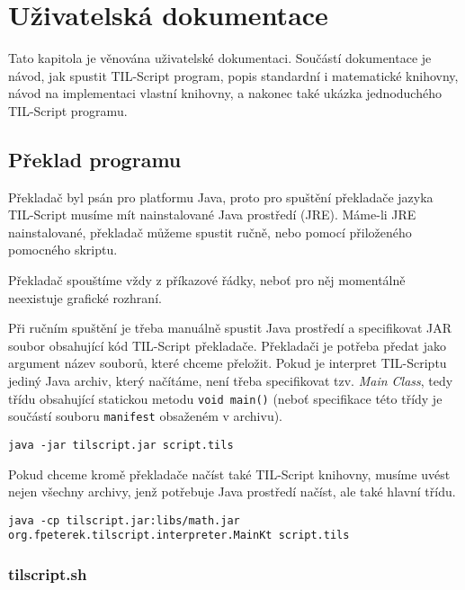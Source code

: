 \chapter{Uživatelská dokumentace}

Tato kapitola je věnována uživatelské dokumentaci. Součástí dokumentace je návod, jak spustit
TIL-Script program, popis standardní i matematické knihovny, návod na implementaci vlastní knihovny,
a nakonec také ukázka jednoduchého TIL-Script programu.

\section{Překlad programu}

Překladač byl psán pro platformu Java, proto pro spuštění překladače jazyka TIL-Script musíme mít
nainstalované Java prostředí (JRE). Máme-li JRE nainstalované, překladač můžeme spustit ručně, nebo
pomocí přiloženého pomocného skriptu.

Překladač spouštíme vždy z příkazové řádky, neboť pro něj momentálně neexistuje grafické rozhraní.

Při ručním spuštění je třeba manuálně spustit Java prostředí a specifikovat JAR soubor obsahující
kód TIL-Script překladače. Překladači je potřeba předat jako argument název souborů, které chceme
přeložit. Pokud je interpret TIL-Scriptu jediný Java archiv, který načítáme, není třeba specifikovat
tzv. \textit{Main Class}, tedy třídu obsahující statickou metodu \lstinline{void main()} (neboť
specifikace této třídy je součástí souboru \lstinline{manifest} obsaženém v archivu).

\begin{lstlisting}[caption={Spuštění překladače}]
java -jar tilscript.jar script.tils
\end{lstlisting}

Pokud chceme kromě překladače načíst také TIL-Script knihovny, musíme uvést nejen všechny archivy,
jenž potřebuje Java prostředí načíst, ale také hlavní třídu.

\begin{lstlisting}[caption={Spuštění překladače s načtením knihoven}]
java -cp tilscript.jar:libs/math.jar org.fpeterek.tilscript.interpreter.MainKt script.tils
\end{lstlisting}

\subsection{tilscript.sh}

